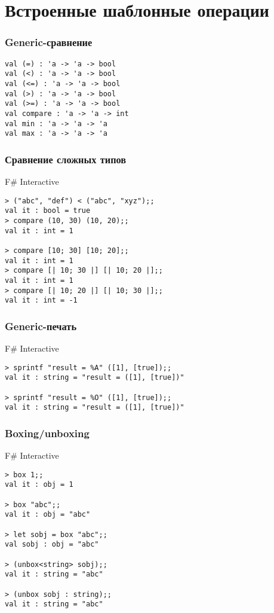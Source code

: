\documentclass[xetex,mathserif,serif]{beamer}
\begin{document}
    \section{Встроенные шаблонные операции}

    \begin{frame}[fragile]
        \frametitle{Generic-сравнение}
        \begin{verbatim}
val (=) : 'a -> 'a -> bool
val (<) : 'a -> 'a -> bool
val (<=) : 'a -> 'a -> bool
val (>) : 'a -> 'a -> bool
val (>=) : 'a -> 'a -> bool
val compare : 'a -> 'a -> int
val min : 'a -> 'a -> 'a
val max : 'a -> 'a -> 'a
        \end{verbatim}
    \end{frame}

    \begin{frame}[fragile]
        \frametitle{Сравнение сложных типов}
        \begin{alertblock}{F\# Interactive}
            \begin{verbatim}
> ("abc", "def") < ("abc", "xyz");;
val it : bool = true
> compare (10, 30) (10, 20);;
val it : int = 1

> compare [10; 30] [10; 20];;
val it : int = 1
> compare [| 10; 30 |] [| 10; 20 |];;
val it : int = 1
> compare [| 10; 20 |] [| 10; 30 |];;
val it : int = -1
            \end{verbatim}
        \end{alertblock}
    \end{frame}

    \begin{frame}[fragile]
        \frametitle{Generic-печать}
        \begin{alertblock}{F\# Interactive}
            \begin{verbatim}
> sprintf "result = %A" ([1], [true]);;
val it : string = "result = ([1], [true])"

> sprintf "result = %O" ([1], [true]);;
val it : string = "result = ([1], [true])"
            \end{verbatim}
        \end{alertblock}
    \end{frame}

    \begin{frame}[fragile]
        \frametitle{Boxing/unboxing}
        \begin{alertblock}{F\# Interactive}
            \begin{verbatim}
> box 1;;
val it : obj = 1

> box "abc";;
val it : obj = "abc"

> let sobj = box "abc";;
val sobj : obj = "abc"

> (unbox<string> sobj);;
val it : string = "abc"

> (unbox sobj : string);;
val it : string = "abc"
            \end{verbatim}
        \end{alertblock}
    \end{frame}
\end{document}

